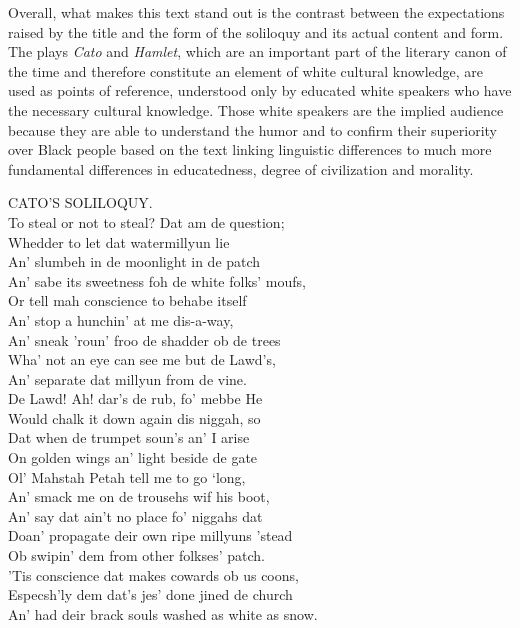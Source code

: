 Overall, what makes this text stand out is the contrast between the expectations raised by the title and the form of the soliloquy and its actual content and form. The plays \emph{Cato} and \emph{Hamlet}, which are an important part of the literary canon of the time and therefore constitute an element of white cultural knowledge, are used as points of reference, understood only by educated white speakers who have the necessary cultural knowledge. Those white speakers are the implied audience because they are able to understand the humor and to confirm their superiority over Black people based on the text linking linguistic differences to much more fundamental differences in educatedness, degree of civilization and morality.


\begin{ipquote}
CATO’S SOLILOQUY.\\
To steal or not to steal? Dat am de question;\\
Whedder to let dat watermillyun lie\\
An’ slumbeh in de moonlight in de patch\\
An’ sabe its sweetness foh de white folks’ moufs,\\
Or tell mah conscience to behabe itself\\
An’ stop a hunchin’ at me dis-a-way,\\
An’ sneak ’roun’ froo de shadder ob de trees\\
Wha’ not an eye can see me but de Lawd’s,\\
An’ separate dat millyun from de vine.\\
De Lawd! Ah! dar’s de rub, fo’ mebbe He\\
Would chalk it down again dis niggah, so\\
Dat when de trumpet soun’s an’ I arise\\
On golden wings an’ light beside de gate\\
Ol’ Mahstah Petah tell me to go ‘long,\\
An’ smack me on de trousehs wif his boot,\\
An’ say dat ain’t no place fo’ niggahs dat\\
Doan’ propagate deir own ripe millyuns ’stead\\
Ob swipin’ dem from other folkses’ patch.\\
’Tis conscience dat makes cowards ob us coons,\\
Especsh’ly dem dat’s jes’ done jined de church\\
An’ had deir brack souls washed as white as snow.\\

\end{ipquote}
